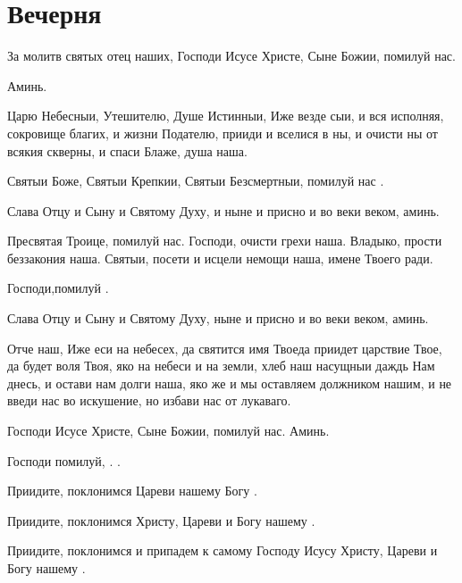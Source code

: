 \section{Вечерня}\begin{mymulticols}





За молитв святых отец наших, Господи Исусе Христе, Сыне Божии, помилуй нас.

 Аминь.

Царю Небесныи, Утешителю, Душе Истинныи, Иже везде сыи, и вся исполняя, сокровище благих, и жизни Подателю, прииди и вселися в ны, и очисти ны от всякия скверны, и спаси Блаже, душа наша.

Святыи Боже, Святыи Крепкии, Святыи Безсмертныи, помилуй нас . 

Слава Отцу и Сыну и Святому Духу, и ныне и присно и во веки веком, аминь.

Пресвятая Троице, помилуй нас. Господи, очисти грехи наша. Владыко, прости беззакония наша. Святыи, посети и исцели немощи наша, имене Твоего ради.

Господи,помилуй .

Слава Отцу и Сыну и Святому Духу, ныне и присно и во веки веком, аминь.

Отче наш, Иже еси на небесех, да святится имя Твоеда приидет царствие Твое, да будет воля Твоя, яко на небеси и на земли, хлеб наш насущныи даждь Нам днесь, и остави нам долги наша, яко же и мы оставляем должником нашим, и не введи нас во искушение, но избави нас от лукаваго.

Господи Исусе Христе, Сыне Божии, помилуй нас. Аминь.

Господи помилуй, . .

Приидите, поклонимся Цареви нашему Богу .

Приидите, поклонимся Христу, Цареви и Богу нашему .

Приидите, поклонимся и припадем к самому Господу Исусу Христу, Цареви и Богу нашему .





\end{mymulticols}
